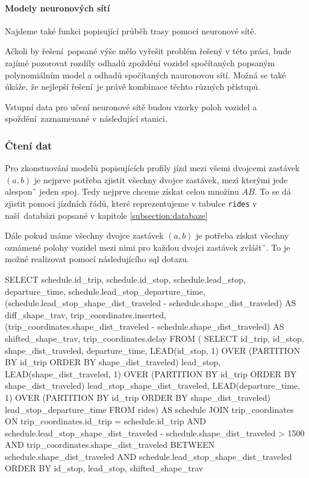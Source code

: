 \paragraph{Modely neuronových sítí}

Najdeme také funkci popisující průběh trasy pomocí neuronové sítě.

\bigbreak

Ačkoli by řešení popsané výše mělo vyřešit problém řešený v této práci, bude zajímé pozorovat rozdíly odhadů zpoždění vozidel spočítaných popsaným polynomiálním model a odhadů spočítaných nauronovou sítí. Možná se také úkáže, že nejlepší řešení je právě kombinace těchto různých přístupů.

\bigbreak

Vstupní data pro učení neuronové sítě budou vzorky poloh vozidel a spoždění zaznamenané v následující stanici.

\subsubsection{Čtení dat}

Pro zkonstuování modelů popisujících profily jízd mezi všemi dvojcemi zastávek $(a, b)$ je nejprve potřeba zjistit všechny dvojce zastávek, mezi kterými jede alesponˇ jeden spoj. Tedy nejprve chceme získat celou množinu $AB$. To se dá zjistit pomocí jízdních řádů, které reprezentujeme v tabulce \verb-rides- v naší databázi popsané v kapitole \ref{subsection:databaze}

\bigbreak

 Dále pokud máme všechny dvojce zastávek $(a, b)$ je potřeba získat všechny oznámené polohy vozidel mezi nimi pro každou dvojci zastávek zvláštˇ. To je možné realizovat pomocí následujícího \gls{sql} dotazu.

\begin{code}[frame=none]
SELECT schedule.id_trip,
  schedule.id_stop,
  schedule.lead_stop,
  departure_time,
  schedule.lead_stop_departure_time,
  (schedule.lead_stop_shape_dist_traveled - schedule.shape_dist_traveled)
    AS diff_shape_trav,
  trip_coordinates.inserted,
  (trip_coordinates.shape_dist_traveled - schedule.shape_dist_traveled)
    AS shifted_shape_trav,
  trip_coordinates.delay
FROM (
  SELECT id_trip, id_stop, shape_dist_traveled, departure_time,
    LEAD(id_stop, 1) OVER (PARTITION BY
	  id_trip ORDER BY shape_dist_traveled) lead_stop,
    LEAD(shape_dist_traveled, 1) OVER (PARTITION BY
	  id_trip ORDER BY shape_dist_traveled) lead_stop_shape_dist_traveled,
    LEAD(departure_time, 1) OVER (PARTITION BY
	  id_trip ORDER BY shape_dist_traveled) lead_stop_departure_time
  FROM rides) AS schedule
JOIN trip_coordinates
ON trip_coordinates.id_trip = schedule.id_trip AND
  schedule.lead_stop_shape_dist_traveled -
    schedule.shape_dist_traveled > 1500 AND
  trip_coordinates.shape_dist_traveled
    BETWEEN schedule.shape_dist_traveled AND
  schedule.lead_stop_shape_dist_traveled
ORDER BY id_stop, lead_stop, shifted_shape_trav
\end{code}

